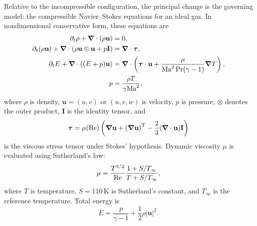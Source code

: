\documentclass[twocolumn,10pt]{tsfp}
\begin{document}
Relative to the incompressible configuration, the principal change is the governing model: the compressible Navier--Stokes equations for an ideal gas. In nondimensional conservative form, these equations are
\begin{equation}
	\begin{aligned}
		\partial_t \rho + \grad \cdot (\rho \mathbf{u})                                              & = 0,                           \\
		\partial_t (\rho \mathbf{u}) +\grad \cdot (\rho \mathbf{u} \otimes \mathbf{u} + p\mathbf{I}) & = \grad \cdot \bm{\tau},       \\
		\partial_t E+\grad \cdot ((E+p)\mathbf{u})                                                   & =
		\grad \cdot \left(\boldsymbol{\tau} \cdot \mathbf{u} + \frac{\mu}{\mathrm{Ma}^2 \Pr (\gamma - 1)} \grad T\right),                     \\
		p                                                                                            & = \frac{\rho T}{\gamma \mathrm{Ma}^2},
	\end{aligned}
\end{equation}
where $\rho$ is density, $\mathbf{u} = (u,v)$ or $(u,v,w)$ is velocity, $p$ is pressure, $\otimes$ denotes the outer product, $\mathbf{I}$ is the identity tensor, and
\begin{equation}
	\bm{\tau} = \mu(\mathrm{Re}) \left( \grad \mathbf{u} + {(\grad \mathbf{u})}^{\mathrm{T}} - \frac{2}{3} (\grad \cdot \mathbf{u}) \mathbf{I} \right)
\end{equation}
is the viscous stress tensor under Stokes' hypothesis. Dynamic viscosity $\mu$ is evaluated using Sutherland's law:
\begin{equation}
	\mu =\frac{T^{3/2}}{\mathrm{Re}} \frac{1 + S/T_\infty}{T + S/T_\infty},
\end{equation}
where $T$ is temperature, $S=110$\,K is Sutherland's constant, and $T_\infty$ is the reference temperature. Total energy is
\begin{equation}
	E = \frac{p}{\gamma - 1} + \frac{1}{2} \rho |\mathbf{u}|^2.
\end{equation}
\end{document}
